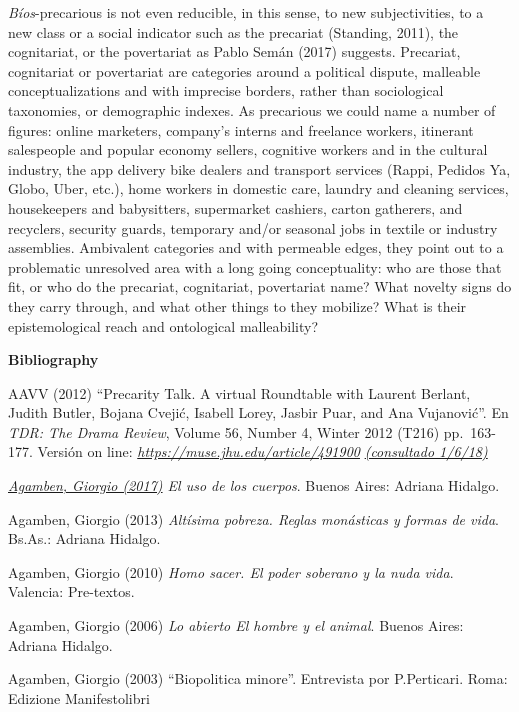 \documentclass[a4paper,]{scrartcl}
\begin{document}
\emph{Bíos}-precarious is not even reducible, in this sense, to new
subjectivities, to a new class or a social indicator such as the
precariat (Standing, 2011), the cognitariat, or the povertariat as Pablo
Semán (2017) suggests. Precariat, cognitariat or povertariat are
categories around a political dispute, malleable conceptualizations and
with imprecise borders, rather than sociological taxonomies, or
demographic indexes. As precarious we could name a number of figures:
online marketers, company's interns and freelance workers, itinerant
salespeople and popular economy sellers, cognitive workers and in the
cultural industry, the app delivery bike dealers and transport services
(Rappi, Pedidos Ya, Globo, Uber, etc.), home workers in domestic care,
laundry and cleaning services, housekeepers and babysitters, supermarket
cashiers, carton gatherers, and recyclers, security guards, temporary
and/or seasonal jobs in textile or industry assemblies. Ambivalent
categories and with permeable edges, they point out to a problematic
unresolved area with a long going conceptuality: who are those that fit,
or who do the precariat, cognitariat, povertariat name? What novelty
signs do they carry through, and what other things to they mobilize?
What is their epistemological reach and ontological malleability?


\textbf{Bibliography}

AAVV (2012) ``Precarity Talk. A virtual Roundtable with Laurent Berlant,
Judith Butler, Bojana Cvejić, Isabell Lorey, Jasbir Puar, and Ana
Vujanović''. En \emph{TDR: The Drama Review}, Volume 56, Number 4,
Winter 2012 (T216) pp.~163-177. Versión on line:
\href{https://muse.jhu.edu/article/491900}{\emph{https://muse.jhu.edu/article/491900}}
\href{https://muse.jhu.edu/journal/193}{\emph{(consultado 1/6/18)}}

\emph{\href{https://muse.jhu.edu/journal/193}{Agamben, Giorgio (2017)}
El uso de los cuerpos}. Buenos Aires: Adriana Hidalgo.

Agamben, Giorgio (2013) \emph{Altísima pobreza. Reglas monásticas y
formas de vida}. Bs.As.: Adriana Hidalgo.

Agamben, Giorgio (2010) \emph{Homo sacer. El poder soberano y la nuda
vida}. Valencia: Pre-textos.

Agamben, Giorgio (2006) \emph{Lo abierto El hombre y el animal}. Buenos
Aires: Adriana Hidalgo.

Agamben, Giorgio (2003) ``Biopolitica minore''. Entrevista por
P.Perticari. Roma: Edizione Manifestolibri
\end{document}

